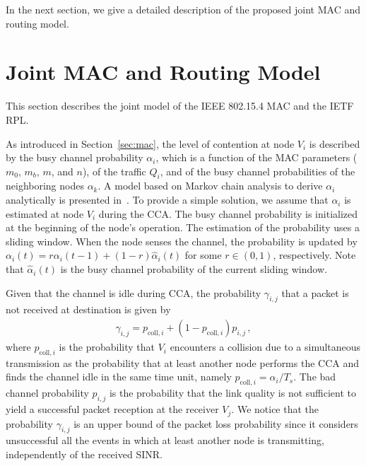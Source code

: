 \documentclass[review, 1p, 11pt]{elsarticle}
\numberwithin{equation}{section}
\begin{document}
In the next section, we give a detailed description of the proposed joint MAC and routing model.


\section{Joint MAC and Routing Model} \label{sec:interactions}
This section describes the joint model of the IEEE 802.15.4 MAC and the IETF RPL.

As introduced in Section~\ref{sec:mac}, the level of contention at node $V_i$ is described by the busy channel probability $\alpha_i$, which is a function of the MAC parameters ($m_0$, $m_b$, $m$, and $n$), of the traffic $Q_i$, and of the busy channel probabilities of the neighboring nodes $\alpha_k$.
A model based on Markov chain analysis to derive $\alpha_i$ analytically is presented in~\cite{PG_TVT}. To provide a simple solution, we assume that $\alpha_i$ is estimated at node $V_i$ during the CCA. The busy channel probability is initialized at the beginning of the node's operation. The estimation of the probability uses a sliding window. When the node senses the channel, the probability is updated by $\alpha_i(t) =
r \alpha_i(t-1) + (1-r)\hat{\alpha}_i(t)$ for some $r\in (0,1)$, respectively. Note that $\hat{\alpha}_i(t)$ is the busy channel probability of the current sliding window.

Given that the channel is idle during CCA, the probability $\gamma_{i,j}$ that a packet is not received at destination  is given by
\begin{align} \label{eq:gamma}
\gamma_{i,j} = p_{\mathrm{coll},i} + (1- p_{\mathrm{coll},i}) p_{i,j} \,,
\end{align}
where $p_{\mathrm{coll},i}$ is the probability that $V_i$ encounters a collision due to a simultaneous transmission as the probability that at least another node performs the CCA and finds the channel idle in the same time unit, namely
$p_{\mathrm{coll},i} = \alpha_i/T_s$.
The bad channel probability $p_{i,j}$ is the probability that the link quality is not sufficient to yield a successful packet reception at the receiver $V_j$.
We notice that the probability $\gamma_{i,j}$ is an upper bound of the packet loss probability since it considers unsuccessful all the events in which at least another node is transmitting, independently of the received SINR.
\end{document}
